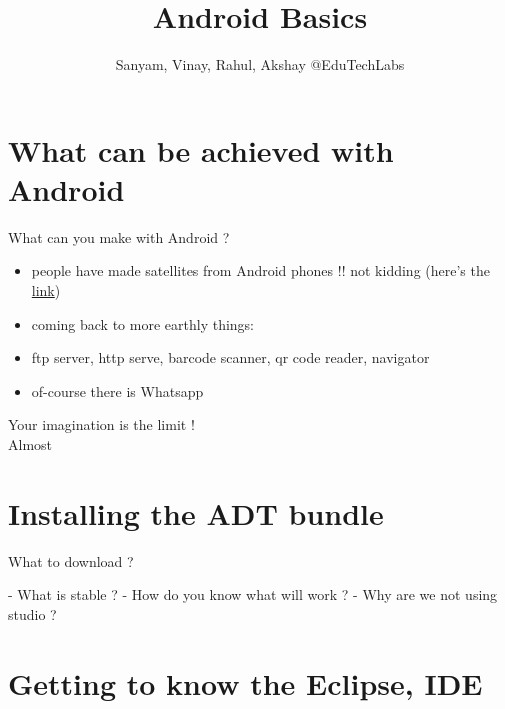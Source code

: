 \documentclass[11pt]{beamer}
\author{Sanyam, Vinay, Rahul, Akshay @EduTechLabs}
\title{Android Basics}
\begin{document}
\begin{frame}
\titlepage
\end{frame}


\section{What can be achieved with Android}

\begin{frame}[containsverbatim]{What can you make with Android ?}

	\begin{flushleft}
		\begin{itemize}			
		\item people have made satellites from Android phones !! not kidding (here's the \href{http://www.theverge.com/2013/5/3/4297718/nasa-phonesat-android-nexus-returns-images}{link})
		\item coming back to more earthly things:
		\item ftp server, http serve, barcode scanner, qr code reader, navigator 
		\item of-course there is Whatsapp
		\end{itemize}	
	\end{flushleft}

\huge Your imagination is the limit ! \\

\normalsize Almost 
\end{frame}


\section{Installing the ADT bundle}

\begin{frame}[containsverbatim]{What to download ?}
	\begin{flushleft}
		 - What is stable ?
		 - How do you know what will work ?
		 - Why are we not using studio ?
	\end{flushleft}
\end{frame}

\section{Getting to know the Eclipse, IDE}
\end{document}
